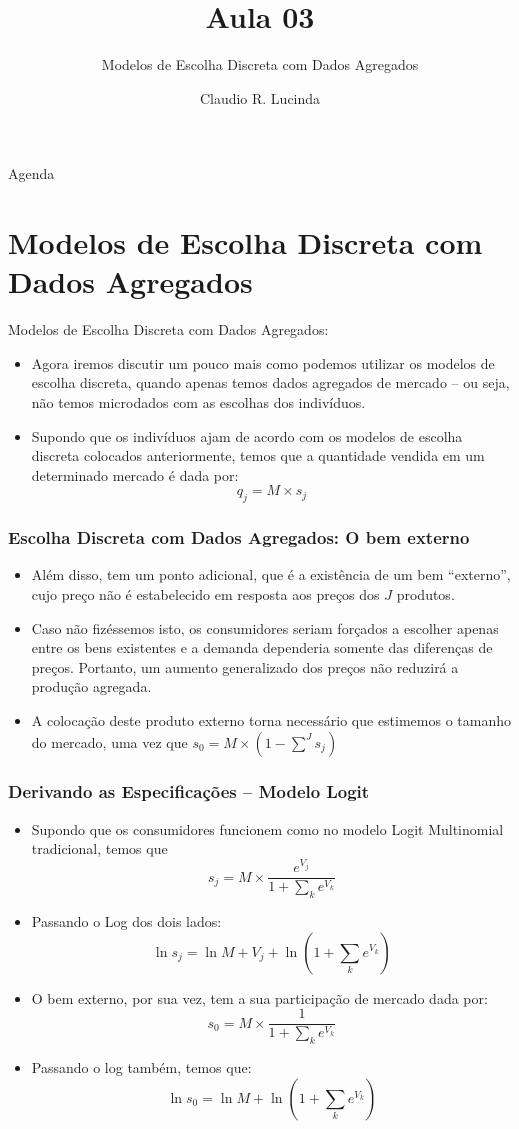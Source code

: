 \documentclass{beamer}
\title{Aula 03}
\subtitle{Modelos de Escolha Discreta com Dados Agregados}
\author{Claudio R. Lucinda}
\institute{FEA-RP/USP}
\date{}
\begin{document}
\frame{\titlepage}
\begin{frame}{Agenda}
  \tableofcontents[pausesections]
\end{frame}


\section{Modelos de Escolha Discreta com Dados Agregados}
\begin{frame}{Modelos de Escolha Discreta com Dados Agregados:}
\begin{itemize}
\item Agora iremos discutir um pouco mais como podemos utilizar os modelos
de escolha discreta, quando apenas temos dados agregados de mercado
-- ou seja, não temos microdados com as escolhas dos indivíduos.
\item Supondo que os indivíduos ajam de acordo com os modelos de escolha
discreta colocados anteriormente, temos que a quantidade vendida em
um determinado mercado é dada por:
\[
q_{j}=M\times s_{j}
\]
\end{itemize}
\end{frame}

\begin{frame}\frametitle{Escolha Discreta com Dados Agregados: O bem externo}

\begin{itemize}
\item Além disso, tem um ponto adicional, que é a existência de um bem ``externo'',
cujo preço não é estabelecido em resposta aos preços dos $J$ produtos. 
\item Caso não fizéssemos isto, os consumidores seriam forçados a escolher
apenas entre os bens existentes e a demanda dependeria somente das
diferenças de preços. Portanto, um aumento generalizado dos preços
não reduzirá a produção agregada. 
\item A colocação deste produto externo torna necessário que estimemos o
tamanho do mercado, uma vez que $s_{0}=M\times(1-\sum^{J}s_{j})$
\end{itemize}
\end{frame}

\begin{frame}\frametitle{Derivando as Especificações -- Modelo Logit}

\begin{itemize}
\item Supondo que os consumidores funcionem como no modelo Logit Multinomial
tradicional, temos que
\[
s_{j}=M\times\frac{e^{V_{j}}}{1+\sum_{k}e^{V_{k}}}
\]
\item Passando o Log dos dois lados:
\[
\ln s_{j}=\ln M+V_{j}+\ln(1+\sum_{k}e^{V_{k}})
\]
\item O bem externo, por sua vez, tem a sua participação de mercado dada
por:
\[
s_{0}=M\times\frac{1}{1+\sum_{k}e^{V_{k}}}
\]
\item Passando o log também, temos que:
\[
\ln s_{0}=\ln M+\ln(1+\sum_{k}e^{V_{k}})
\]
\end{itemize}
\end{frame}
\end{document}
